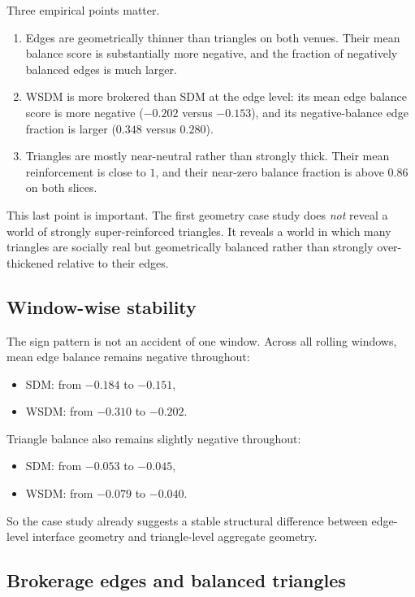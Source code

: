 \documentclass[11pt]{article}
\begin{document}
Three empirical points matter.
\begin{enumerate}[label=(\arabic*)]
    \item Edges are geometrically thinner than triangles on both venues. Their mean balance score is substantially more negative, and the fraction of negatively balanced edges is much larger.
    \item WSDM is more brokered than SDM at the edge level: its mean edge balance score is more negative ($-0.202$ versus $-0.153$), and its negative-balance edge fraction is larger ($0.348$ versus $0.280$).
    \item Triangles are mostly near-neutral rather than strongly thick. Their mean reinforcement is close to $1$, and their near-zero balance fraction is above $0.86$ on both slices.
\end{enumerate}

This last point is important. The first geometry case study does \emph{not} reveal a world of strongly super-reinforced triangles. It reveals a world in which many triangles are socially real but geometrically balanced rather than strongly over-thickened relative to their edges.

\subsection{Window-wise stability}

The sign pattern is not an accident of one window. Across all rolling windows, mean edge balance remains negative throughout:
\begin{itemize}
    \item SDM: from $-0.184$ to $-0.151$,
    \item WSDM: from $-0.310$ to $-0.202$.
\end{itemize}
Triangle balance also remains slightly negative throughout:
\begin{itemize}
    \item SDM: from $-0.053$ to $-0.045$,
    \item WSDM: from $-0.079$ to $-0.040$.
\end{itemize}
So the case study already suggests a stable structural difference between edge-level interface geometry and triangle-level aggregate geometry.

\subsection{Brokerage edges and balanced triangles}
\end{document}
